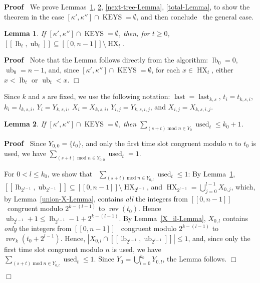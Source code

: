 \documentclass{article}
\newcommand{\tmem}[1]{{\em #1\/}}
\newcommand{\tmop}[1]{\ensuremath{\operatorname{#1}}}
\newenvironment{proof}{\noindent\textbf{Proof\ }}{\hspace*{\fill}$\Box$\medskip}
\newtheorem{lemma}{Lemma}
\begin{document}
\begin{proof}
  We prove Lemmas~\ref{clipped-Lemma}, \ref{first-tree-Lemma},
  \ref{next-tree-Lemma}, \ref{total-Lemma}, to show the theorem in the case
  $[\kappa', \kappa''] \cap \tmop{KEYS} = \emptyset$, and then conclude \ the
  general case.
  
  \begin{lemma}
    \label{clipped-Lemma} If $[\kappa', \kappa''] \cap \tmop{KEYS} =
    \emptyset$, then, for $t \geq 0$, \ $[[\tmop{lb}_t, \tmop{ub}_t]]
    \subseteq [[0, n - 1]] \setminus \tmop{HX}_t $.
  \end{lemma}
  
  \begin{proof}
    Note that the Lemma follows directly from
    the algorithm: $\tmop{lb}_0 = 0$, $\tmop{ub}_0 = n - 1$, and, since
    $[\kappa', \kappa''] \cap \tmop{KEYS} = \emptyset$, for each $x \in
    \tmop{HX}_t$, either $x < \tmop{lb}_t$ or $\tmop{ub}_t < x$. 
  \end{proof}
  
  Since $k$ and $s$ are fixed, we use the following notation: $\tmop{last} =
  \tmop{last}_{k, s}$, $t_i = t_{k, s, i}$, $k_i = l_{k, s, i}$, $Y_i = Y_{k,
  s, i}$, $X_i = X_{k, s, i}$, $Y_{i, j} = Y_{k, s, i, j}$, and $X_{i, j} =
  X_{k, s, i, j}$.
  
  \begin{lemma}
    \label{first-tree-Lemma} If $[\kappa', \kappa''] \cap \tmop{KEYS} =
    \emptyset$, then $\sum_{(s + t) \tmop{mod} n \in Y_0} \tmop{used}_t \leq
    k_0 + 1$.
  \end{lemma}
  
  \begin{proof}
    Since $Y_{0, 0} =\{t_0 \}$, and only the
    first time slot congruent modulo $n$ to $t_0$ is used, we have $\sum_{(s +
    t) \tmop{mod} n \in Y_{0, 0}} \tmop{used}_t = 1$.
    
    For $0 < l \leq k_0$, we show that \ $\sum_{(s + t) \tmop{mod} n \in Y_{0,
    l}} \tmop{used}_t \leq 1$: By Lemma~\ref{clipped-Lemma},
    $[[\tmop{lb}_{2^{l - 1}}, \tmop{ub}_{2^{l - 1}}]] \subseteq [[0, n - 1]]
    \setminus \tmop{HX}_{2^{l - 1}}$, and $\tmop{HX}_{2^{l - 1}} = \bigcup_{j
    = 0}^{l - 1} X_{0, j}$, which, by Lemma~\ref{union-X-Lemma}, contains
    {\tmem{all}} the integers from $[[0, n - 1]]$ \ congruent modulo $2^{k -
    (l - 1)}$ to $\tmop{rev} (t_0)$. Hence $\tmop{ub}_{2^{l - 1}} + 1 \leq
    \tmop{lb}_{2^{l - 1}} - 1 + 2^{k - (l - 1)}$. By Lemma~\ref{X_il-Lemma},
    $X_{0, l}$ contains {\tmem{only}} the integers from $[[0, n - 1]]$ \
    congruent modulo $2^{k - (l - 1)}$ to $\tmop{rev}_k (t_0 + 2^{l - 1})$.
    Hence, $|X_{0, l} \cap [[\tmop{lb}_{2^{l - 1}}, \tmop{ub}_{2^{l - 1}}]] |
    \leq 1$, and, since only the first time slot congruent modulo $n$ is used,
    we have \ $\sum_{(s + t) \tmop{mod} n \in Y_{0, l}} \tmop{used}_t \leq 1$.
    Since $Y_0 = \bigcup_{l = 0}^{k_0} Y_{0, l}$, the Lemma follows.
  \end{proof}
  

\end{proof}
\end{document}
